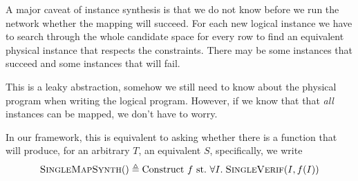 
A major caveat of instance synthesis is that we do not know before we
run the network whether the mapping will succeed. For each new logical
instance we have to search through the whole candidate space for every
row to find an equivalent physical instance that respects the
constraints. There may be some instances that succeed and some
instances that will fail.

This is a leaky abstraction, somehow we still need to know about the
physical program when writing the logical program. However, if we know
that that \emph{all} instances can be mapped, we don't have to worry.

In our framework, this is equivalent to asking whether there is a
function that will produce, for an arbitrary $T$, an equivalent $S$,
specifically, we write
\[\textsc{SingleMapSynth}() \triangleq \textrm{Construct}~f~\textrm{st.}~\forall I.\;
  \textsc{SingleVerif}(I, f(I))\]





